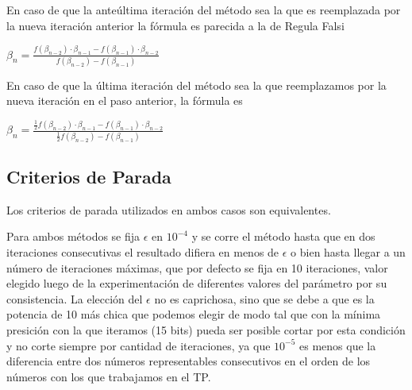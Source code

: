 En caso de que la ante\'ultima iteraci\'on del m\'etodo sea la que es reemplazada por la nueva iteraci\'on anterior la f\'ormula es parecida a la de Regula Falsi

$\beta_n = \frac{f(\beta_{n-2})\cdot \beta_{n-1} - f(\beta_{n-1})\cdot\beta_{n-2}}
{f(\beta_{n-2})-f(\beta_{n-1})}$

En caso de que la \'ultima iteraci\'on del m\'etodo sea la que reemplazamos por la nueva iteraci\'on en el paso anterior, la f\'ormula es

$\beta_n = \frac{\frac{1}{2}f(\beta_{n-2})\cdot \beta_{n-1} - f(\beta_{n-1})\cdot\beta_{n-2}}
{\frac{1}{2}f(\beta_{n-2})-f(\beta_{n-1})}$

\subsection{Criterios de Parada}	

Los criterios de parada utilizados en ambos casos son equivalentes.

Para ambos m\'etodos se fija $\epsilon$ en $10^{-4}$ y se corre el m\'etodo hasta que en dos iteraciones consecutivas el resultado difiera en menos de $\epsilon$ o bien hasta llegar a un n\'umero de iteraciones m\'aximas, que por defecto se fija en 10 iteraciones, valor elegido luego de la experimentaci\'on de diferentes valores del par\'ametro por su consistencia.
La elecci\'on del $\epsilon$ no es caprichosa, sino que se debe a que es la potencia de 10 m\'as chica que podemos elegir de modo tal que con la m\'inima presici\'on con la que iteramos (15 bits) pueda ser posible cortar por esta condici\'on y no corte siempre por cantidad de iteraciones, ya que $10^{-5}$ es menos que la diferencia entre dos n\'umeros representables consecutivos en el orden de los n\'umeros con los que trabajamos en el TP.
